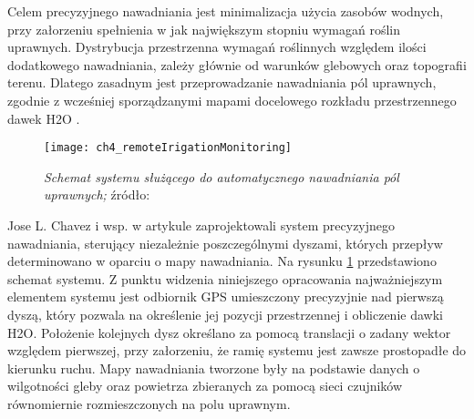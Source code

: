 Celem precyzyjnego nawadniania jest minimalizacja użycia zasobów wodnych, przy załorzeniu  spełnienia w jak największym stopniu wymagań roślin uprawnych.
Dystrybucja przestrzenna wymagań roślinnych względem ilości dodatkowego nawadniania, zależy głównie od warunków glebowych oraz topografii terenu.
Dlatego zasadnym jest przeprowadzanie nawadniania pól uprawnych, zgodnie z wcześniej sporządzanymi mapami docelowego rozkładu przestrzennego dawek H2O 
\cite{PA_RemoteIrrigation}.
\begin{figure}[H]
\centering
\texttt{[image: ch4\_remoteIrigationMonitoring]}
\caption{\textit{Schemat systemu służącego do automatycznego nawadniania pól uprawnych;} źródło: \cite[][strona 04]{PA_RemoteIrrigation}}
\label{fig:ch4_remoteIrigationMonitoring}
\end{figure}
Jose L. Chavez i wsp. w artykule \cite{PA_RemoteIrrigation} zaprojektowali system precyzyjnego nawadniania, sterujący niezależnie poszczególnymi dyszami,
których przepływ determinowano w oparciu o mapy nawadniania. Na rysunku \ref{fig:ch4_remoteIrigationMonitoring} przedstawiono schemat systemu.
Z punktu widzenia niniejszego opracowania najważniejszym elementem systemu jest odbiornik GPS umieszczony precyzyjnie nad pierwszą dyszą,
który pozwala na określenie jej pozycji przestrzennej i obliczenie dawki H2O. Położenie kolejnych dysz określano za pomocą translacji
o zadany wektor względem pierwszej, przy załorzeniu, że ramię systemu jest zawsze prostopadłe do kierunku ruchu.
Mapy nawadniania tworzone były na podstawie danych o wilgotności gleby oraz powietrza zbieranych za pomocą sieci czujników
równomiernie rozmieszczonych na polu uprawnym. 


